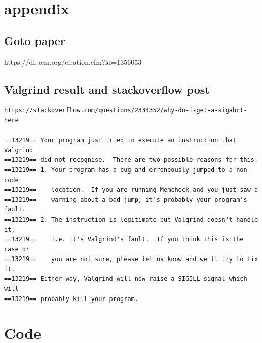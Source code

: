 \documentclass[a4paper,10pt,titlepage]{report}
\begin{document}
\newpage
\section{appendix}
\subsection{Goto paper }
https://dl.acm.org/citation.cfm?id=1356053 \\
\subsection{Valgrind result and stackoverflow post}

\begin{lstlisting}
https://stackoverflow.com/questions/2334352/why-do-i-get-a-sigabrt-here

==13219== Your program just tried to execute an instruction that Valgrind
==13219== did not recognise.  There are two possible reasons for this.
==13219== 1. Your program has a bug and erroneously jumped to a non-code
==13219==    location.  If you are running Memcheck and you just saw a
==13219==    warning about a bad jump, it's probably your program's fault.
==13219== 2. The instruction is legitimate but Valgrind doesn't handle it,
==13219==    i.e. it's Valgrind's fault.  If you think this is the case or
==13219==    you are not sure, please let us know and we'll try to fix it.
==13219== Either way, Valgrind will now raise a SIGILL signal which will
==13219== probably kill your program.
\end{lstlisting}


\section{Code}



%
\end{document}
